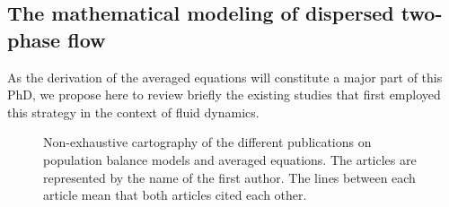 \subsection{The mathematical modeling of dispersed two-phase flow} 


As the derivation of the averaged equations will constitute a major part of this PhD, we propose here to review briefly the existing studies that first employed this strategy in the context of fluid dynamics. 


\begin{figure}[h!]
    \centering
    \caption{Non-exhaustive cartography of the different publications on population balance models and averaged equations. The articles are represented by the name of the first author. The lines between each article mean that both articles cited each other.}
    \label{fig:carte}
\end{figure}
